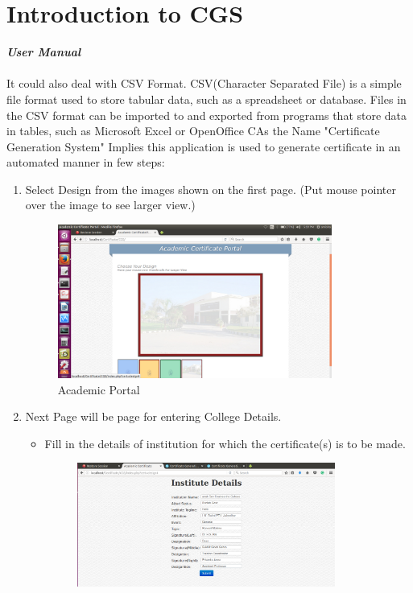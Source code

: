\section{Introduction to CGS}
\textbf{\emph{User Manual}}\\\\
It could also deal with CSV Format. CSV(Character Separated File) is a simple file format used to store tabular data, such as a
spreadsheet or database. Files in the CSV format can be imported to and exported from programs
that store data in tables, such as Microsoft Excel or OpenOffice CAs the Name "Certificate Generation System" Implies this application is used to 
generate certificate in an automated manner in few steps: 
\begin{enumerate}
\item Select Design from the images shown on the first page.
   (Put mouse pointer over the image to see larger view.)
\begin{figure}[!ht]
\centering
\includegraphics[width=0.85\textwidth]{images/cgs/cgs1.png}
\caption{Academic Portal}
\hspace{-1.5em}
\end{figure}
\item Next Page will be page for entering College Details.
\begin{itemize}
\item Fill in the details of institution for which the certificate(s) is to be made.
\begin{figure}[!ht]
\centering
\includegraphics[width=0.85\textwidth]{images/cgs/cgs2.png}                  

\end{figure}
\end{itemize}
\end{enumerate}

